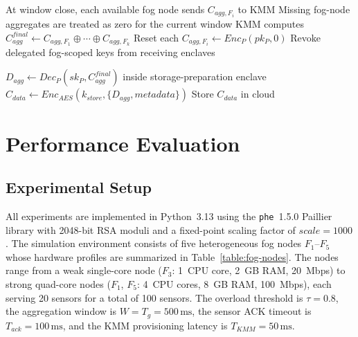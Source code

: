 \documentclass[conference]{IEEEtran}
\begin{document}
\begin{algorithm}
\begin{algorithmic}[1]
\STATE At window close, each available fog node sends $C_{agg,F_i}$ to KMM
\STATE Missing fog-node aggregates are treated as zero for the current window
\STATE KMM computes $C_{agg}^{final}\leftarrow C_{agg,F_1}\oplus\cdots\oplus C_{agg,F_k}$
\STATE Reset each $C_{agg,F_i}\leftarrow Enc_P(pk_P,0)$
\STATE Revoke delegated fog-scoped keys from receiving enclaves

\STATE $D_{agg}\leftarrow Dec_P(sk_P,C_{agg}^{final})$ inside storage-preparation enclave
\STATE $C_{data}\leftarrow Enc_{AES}(k_{store},\{D_{agg},metadata\})$
\STATE Store $C_{data}$ in cloud

\end{algorithmic}
\end{algorithm}

    \section{Performance Evaluation}
    \label{sec:evaluation}

    \subsection{Experimental Setup}
    \label{sec:eval-setup}

    All experiments are implemented in Python~3.13 using the \texttt{phe}~1.5.0 Paillier library with 2048-bit RSA moduli and a fixed-point scaling factor of $scale=1000$. The simulation environment consists of five heterogeneous fog nodes $F_1$--$F_5$ whose hardware profiles are summarized in Table~\ref{table:fog-nodes}. The nodes range from a weak single-core node ($F_3$: 1~CPU core, 2~GB RAM, 20~Mbps) to strong quad-core nodes ($F_1$, $F_5$: 4~CPU cores, 8~GB RAM, 100~Mbps), each serving 20 sensors for a total of 100 sensors. The overload threshold is $\tau=0.8$, the aggregation window is $W=T_g=500\,\text{ms}$, the sensor ACK timeout is $T_{ack}=100\,\text{ms}$, and the KMM provisioning latency is $T_{KMM}=50\,\text{ms}$.
\end{document}
